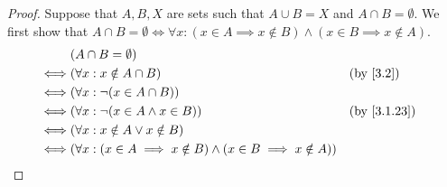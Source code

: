 \begin{proof}
  Suppose that \(A, B, X\) are sets such that \(A \cup B = X\) and \(A \cap B = \emptyset\).
  We first show that \(A \cap B = \emptyset \iff \forall x : (x \in A \implies x \notin B) \land (x \in B \implies x \notin A)\).
  \begin{align*}
         & (A \cap B = \emptyset)                                                                           \\
    \iff & (\forall x : x \notin A \cap B)                                                 &  & \by{3.2}    \\
    \iff & (\forall x : \lnot (x \in A \cap B))                                                             \\
    \iff & (\forall x : \lnot (x \in A \land x \in B))                                     &  & \by{3.1.23} \\
    \iff & (\forall x : x \notin A \lor x \notin B)                                                         \\
    \iff & (\forall x : (x \in A \implies x \notin B) \land (x \in B \implies x \notin A))                  \\
  \end{align*}


\end{proof}
